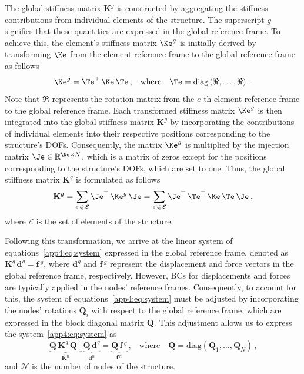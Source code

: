 The global stiffness matrix $\mathbf{K}^{g}$ is constructed by aggregating the stiffness contributions from individual elements of the structure. The superscript $g$ signifies that these quantities are expressed in the global reference frame. To achieve this, the element's stiffness matrix $\Ke^{g}$ is initially derived by transforming $\Ke$ from the element reference frame to the global reference frame as follows
%
\begin{equation*}
  \Ke^{g} = \Te^\top \, \Ke \, \Te \, \text{,} \quad \text{where} \quad \Te = \mathrm{diag}\left( \Re, \dots, \Re \right) \, \text{.}
\end{equation*}
%
Note that $\Re$ represents the rotation matrix from the $e$-th element reference frame to the global reference frame. Each transformed stiffness matrix $\Ke^{g}$ is then integrated into the global stiffness matrix $\mathbf{K}^{g}$ by incorporating the contributions of individual elements into their respective positions corresponding to the structure's \acp{DOF}. Consequently, the matrix $\Ke^{g}$ is multiplied by the injection matrix $\Je \in \mathbb{R}^{\Ne \times N}$, which is a matrix of zeros except for the positions corresponding to the structure's \acp{DOF}, which are set to one. Thus, the global stiffness matrix $\mathbf{K}^{g}$ is formulated as follows
%
\begin{equation*}
  \mathbf{K}^{g} = \sum_{e \, \in \, \mathcal{E}} \Je^\top \, \Ke^{g} \, \Je
   = \sum_{e \, \in \, \mathcal{E}} \Je^\top \, \Te^\top\,\Ke \, \Te \, \Je \, \text{,}
\end{equation*}
%
where $\mathcal{E}$ is the set of elements of the structure.

Following this transformation, we arrive at the linear system of equations~\eqref{app4:eq:system} expressed in the global reference frame, denoted as $\mathbf{K}^{g} \, \mathbf{d}^{g} = \mathbf{f}{\,}^{g}$, where $\mathbf{d}^{g}$ and $\mathbf{f}{\,}^{g}$ represent the displacement and force vectors in the global reference frame, respectively. However, \acp{BC} for displacements and forces are typically applied in the nodes' reference frames. Consequently, to account for this, the system of equations~\eqref{app4:eq:system} must be adjusted by incorporating the nodes' rotations $\mathbf{Q}_{i}$ with respect to the global reference frame, which are expressed in the block diagonal matrix $\mathbf{Q}$. This adjustment allows us to express the system~\eqref{app4:eq:system} as
%
\begin{equation*}
  \underbrace{\mathbf{Q} \, \mathbf{K}^{g} \, \mathbf{Q}^\top}_{\displaystyle\mathbf{K}^{n}} \, \underbrace{\mathbf{Q} \, \mathbf{d}^{g}}_{\displaystyle\mathbf{d}^{n}} = \underbrace{\mathbf{Q} \, \mathbf{f}{\,}^{g}}_{\displaystyle\mathbf{f}{\,}^{n}} \, \text{,} \quad \text{where} \quad \mathbf{Q} = \mathrm{diag}\left( \mathbf{Q}_{1}, \dots, \mathbf{Q}_{N} \right) \, \text{,}
\end{equation*}
%
and $\mathcal{N}$ is the number of nodes of the structure.

